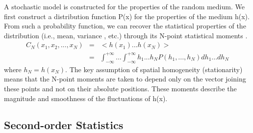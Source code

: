   A stochastic model is constructed for the properties of the random medium.
We first construct a distribution function P(x)
for the properties of the medium h(x). From such a probability function, we
can recover the statistical properties of the distribution (i.e., mean, variance
, etc.) through its N-point statistical moments \cite[]{Goff}.
\begin{eqnarray}
 C_N(x_1,x_2,...,x_N)& =& <h(x_1)...h(x_N)> \nonumber \\
                     & =& \int_{-\infty}^{+\infty}...\int_{-\infty}^{+\infty}h_1...h_NP(
h_1, ...,h_N)dh_1...dh_N \label {eq1}
\end{eqnarray}
where $h_N=h(x_N)$. The key assumption of spatial homogeneity (stationarity) means that the
N-point moments are taken to depend only on the vector joining these points
and not on their absolute positions. 
These moments describe the magnitude and smoothness of the fluctuations
of h(x).

\subsection{Second-order Statistics}

\par

